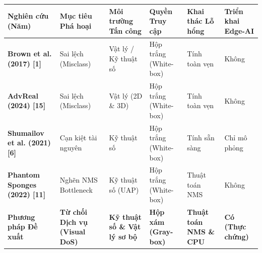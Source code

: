 \begin{longtable}[]{@{}
  >{\centering\arraybackslash}p{}
  >{\centering\arraybackslash}p{}
  >{\centering\arraybackslash}p{}
  >{\centering\arraybackslash}p{}
  >{\centering\arraybackslash}p{}
  >{\centering\arraybackslash}p{}@{}}
\toprule\noalign{}
\begin{minipage}[b]{\linewidth}\centering
\textbf{Nghiên cứu (Năm)}
\end{minipage} & \begin{minipage}[b]{\linewidth}\centering
\textbf{Mục tiêu Phá hoại}
\end{minipage} & \begin{minipage}[b]{\linewidth}\centering
\textbf{Môi trường Tấn công}
\end{minipage} & \begin{minipage}[b]{\linewidth}\centering
\textbf{Quyền Truy cập}
\end{minipage} & \begin{minipage}[b]{\linewidth}\centering
\textbf{Khai thác Lỗ hổng}
\end{minipage} & \begin{minipage}[b]{\linewidth}\centering
\textbf{Triển khai Edge-AI}
\end{minipage} \\
\midrule\noalign{}
\endhead
\bottomrule\noalign{}
\endlastfoot
\textbf{Brown et al. (2017) {[}1{]}} & Sai lệch (Misclass) & Vật lý / Kỹ
thuật số & Hộp trắng (White-box) & Tính toàn vẹn & Không \\
\textbf{AdvReal (2024) {[}15{]}} & Sai lệch (Misclass) & Vật lý (2D \&
3D) & Hộp trắng (White-box) & Tính toàn vẹn & Không \\
\textbf{Shumailov et al. (2021) {[}6{]}} & Cạn kiệt tài nguyên & Kỹ
thuật số & Hộp trắng (White-box) & Tính sẵn sàng & Chỉ mô phỏng \\
\textbf{Phantom Sponges (2022) {[}11{]}} & Nghẽn NMS Bottleneck & Kỹ
thuật số (UAP) & Hộp trắng (White-box) & Thuật toán NMS & Không \\
\textbf{Phương pháp Đề xuất} & \textbf{Từ chối Dịch vụ (Visual DoS)} &
\textbf{Kỹ thuật số \& Vật lý sơ bộ} & \textbf{Hộp xám (Gray-box)} &
\textbf{Thuật toán NMS \& CPU} & \textbf{Có (Thực chứng)} \\
\end{longtable}

